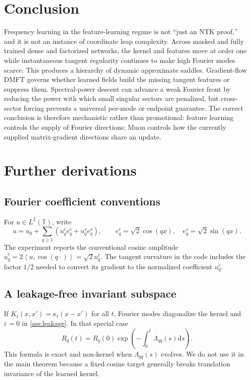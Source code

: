 \documentclass[11pt]{article}
\newcommand{\T}{\mathbb T}
\newcommand{\1}{\mathbf 1}
\newcommand{\ip}[2]{\left\langle #1,#2\right\rangle}
\newcommand{\dd}{\mathrm d}
\theoremstyle{plain}
\theoremstyle{definition}
\begin{document}
\section{Conclusion}

Frequency learning in the feature-learning regime is not ``just an NTK
proof,'' and it is not an instance of coordinate leap complexity.  Across
masked and fully trained dense and factorized networks, the kernel and
features move at order one while instantaneous tangent regularity continues
to make high Fourier modes scarce.  This produces a hierarchy of dynamic
approximate saddles.  Gradient-flow DMFT governs whether learned fields build
the missing tangent features or suppress them.  Spectral-power descent can
advance a weak Fourier front by reducing the power with which small singular
sectors are penalized, but cross-sector forcing prevents a universal
per-mode or endpoint guarantee.  The correct conclusion is therefore
mechanistic rather than promotional: feature learning controls the supply of
Fourier directions; Muon controls how the currently supplied matrix-gradient
directions share an update.

\begingroup
\raggedright


\endgroup

\appendix

\section{Further derivations}

\subsection{Fourier coefficient conventions}

For \(u\in L^2(\T)\), write
\[
 u=u_0+\sum_{q\ge1}(u_q^ce_q^c+u_q^se_q^s),\qquad
 e_q^c=\sqrt2\cos(qx),\quad e_q^s=\sqrt2\sin(qx).
\]
The experiment reports the conventional cosine amplitude
\(\widehat u_q^c=2\ip{u}{\cos(q\cdot)}=\sqrt2u_q^c\).  The tangent
curvature in the code includes the factor \(1/2\) needed to convert its
gradient to the normalized coefficient \(u_q^c\).

\subsection{A leakage-free invariant subspace}

If \(K_t(x,x')=\kappa_t(x-x')\) for all \(t\), Fourier modes diagonalize the
kernel and \(\varepsilon=0\) in \cref{ass:leakage}.  In that special case
\[
 R_q(t)=R_q(0)\exp\left(-\int_0^t\Lambda_{qq}(s)\dd s\right).
\]
This formula is exact and non-kernel when \(\Lambda_{qq}(s)\) evolves.  We do
not use it in the main theorem because a fixed cosine target generally
breaks translation invariance of the learned kernel.
\end{document}
